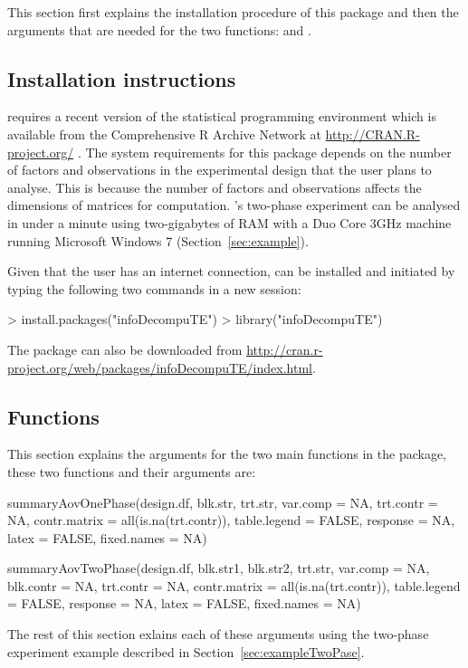 \documentclass[article]{jss}
\begin{document}
This section first explains the installation procedure of this package and then the arguments that are needed for the two functions:  and .

\subsection{Installation instructions}
 requires a recent version of the  statistical programming environment which is available from the Comprehensive R Archive Network at \url{http://CRAN.R-project.org/} \citep{R2012}. The system requirements for this package depends on the number of factors and observations in the experimental design that the user plans to analyse. This is because the number of factors and observations affects the dimensions of matrices for computation. \citeauthor{Brien1999}'s \citeyearpar{Brien1999} two-phase experiment can be analysed in under a minute using two-gigabytes of RAM with a Duo Core 3GHz machine running Microsoft Windows 7 (Section~\ref{sec:example}).

Given that the user has an internet connection,  can be installed and initiated by typing the following two commands in a new  session: 
\begin{CodeChunk}
\begin{CodeInput}
> install.packages("infoDecompuTE")
> library("infoDecompuTE")
\end{CodeInput}
\end{CodeChunk}
The package can also be downloaded from \url{http://cran.r-project.org/web/packages/infoDecompuTE/index.html}.


\subsection{Functions}
This section explains the arguments for the two main functions in the  package, these two functions and their arguments are:
\begin{CodeChunk}
\begin{CodeInput}
summaryAovOnePhase(design.df, blk.str, trt.str, var.comp = NA,
                trt.contr = NA, contr.matrix = all(is.na(trt.contr)),
                table.legend = FALSE, response = NA, latex = FALSE,
                fixed.names = NA)
                
summaryAovTwoPhase(design.df, blk.str1, blk.str2, trt.str, var.comp = NA, 
                blk.contr = NA, trt.contr = NA, 
                contr.matrix = all(is.na(trt.contr)),  table.legend = FALSE,
                response = NA, latex = FALSE, fixed.names = NA)
\end{CodeInput}
\end{CodeChunk}
The rest of this section exlains each of these arguments using the two-phase experiment example described in Section~\ref{sec:exampleTwoPase}.
\end{document}
